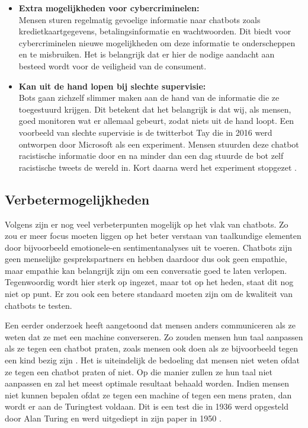 \begin{itemize}
    \item \textbf{Extra mogelijkheden voor cybercriminelen:} \\
    
    Mensen sturen regelmatig gevoelige informatie naar chatbots zoals kredietkaartgegevens, betalingsinformatie en wachtwoorden. Dit biedt voor cybercriminelen nieuwe mogelijkheden om deze informatie te onderscheppen en te misbruiken. Het is belangrijk dat er hier de nodige aandacht aan besteed wordt voor de veiligheid van de consument. \\
    
    \item \textbf{Kan uit de hand lopen bij slechte supervisie:} \\
    
    Bots gaan zichzelf slimmer maken aan de hand van de informatie die ze toegestuurd krijgen. Dit betekent dat het belangrijk is dat wij, als mensen, goed monitoren wat er allemaal gebeurt, zodat niets uit de hand loopt. Een voorbeeld van slechte supervisie is de twitterbot Tay die in 2016 werd ontworpen door Microsoft als een experiment. Mensen stuurden deze chatbot racistische informatie door en na minder dan een dag stuurde de bot zelf racistische tweets de wereld in. Kort daarna werd het experiment stopgezet \autocite{Vincent2016}. \\
    
\end{itemize}

\subsection{Verbetermogelijkheden}
\label{subsec:verbetermogelijkheden}

Volgens \textcite{Hussain2019} zijn er nog veel verbeterpunten mogelijk op het vlak van chatbots. Zo zou er meer focus moeten liggen op het beter verstaan van taalkundige elementen door bijvoorbeeld emotionele-en sentimentanalyses uit te voeren. Chatbots zijn geen menselijke gesprekspartners en hebben daardoor dus ook geen empathie, maar empathie kan belangrijk zijn om een conversatie goed te laten verlopen. Tegenwoordig wordt hier sterk op ingezet, maar tot op het heden, staat dit nog niet op punt. Er zou ook een betere standaard moeten zijn om de kwaliteit van chatbots te testen.

Een eerder onderzoek heeft aangetoond dat mensen anders communiceren als ze weten dat ze met een machine converseren. Zo zouden mensen hun taal aanpassen als ze tegen een chatbot praten, zoals mensen ook doen als ze bijvoorbeeld tegen een kind bezig zijn \autocite{Hill2015}. Het is uiteindelijk de bedoeling dat mensen niet weten ofdat ze tegen een chatbot praten of niet. Op die manier zullen ze hun taal niet aanpassen en zal het meest optimale resultaat behaald worden. Indien mensen niet kunnen bepalen ofdat ze tegen een machine of tegen een mens praten, dan wordt er aan de Turingtest voldaan. Dit is een test die in 1936 werd opgesteld door Alan Turing en werd uitgediept in zijn paper in 1950 \autocite{Turing1950}.

